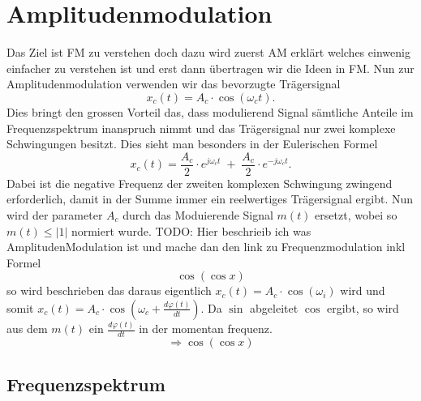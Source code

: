 %
%
%
\section{Amplitudenmodulation\label{fm:section:teil0}}

Das Ziel ist FM zu verstehen doch dazu wird zuerst AM erklärt welches einwenig einfacher zu verstehen ist und erst dann übertragen wir die Ideen in FM.
Nun zur Amplitudenmodulation verwenden wir das bevorzugte Trägersignal
\[
    x_c(t) = A_c \cdot \cos(\omega_ct).
\]
Dies bringt den grossen Vorteil das, dass modulierend Signal sämtliche Anteile im Frequenzspektrum inanspruch nimmt 
und das Trägersignal nur  zwei komplexe Schwingungen besitzt. 
Dies sieht man besonders in der Eulerischen Formel
\[
    x_c(t) = \frac{A_c}{2} \cdot e^{j\omega_ct}\;+\;\frac{A_c}{2} \cdot e^{-j\omega_ct}.
\]
Dabei ist die negative Frequenz der zweiten komplexen Schwingung zwingend erforderlich, damit in der Summe immer ein reelwertiges Trägersignal ergibt.
Nun wird der parameter \(A_c\) durch das  Moduierende Signal \(m(t)\) ersetzt, wobei so \(m(t) \leqslant |1|\) normiert wurde.
\newline
\newline
TODO:
Hier beschrieib ich was AmplitudenModulation ist und mache dan den link zu Frequenzmodulation inkl Formel \[\cos( \cos x)\]
so wird beschrieben das daraus eigentlich \(x_c(t) = A_c \cdot \cos(\omega_i)\) wird und somit \(x_c(t) = A_c \cdot \cos(\omega_c + \frac{d \varphi(t)}{dt})\).
Da \(\sin \) abgeleitet \(\cos \) ergibt, so wird aus dem \(m(t)\) ein \( \frac{d \varphi(t)}{dt}\)  in der momentan frequenz. \[ \Rightarrow \cos( \cos x) \]

\subsection{Frequenzspektrum}